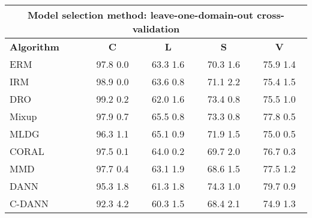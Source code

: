 \documentclass{article}
\begin{document}
\begin{center}
\begin{tabular}{lcccc}
\toprule
\multicolumn{5}{c}{\textbf{Model selection method: leave-one-domain-out cross-validation}} \\
\midrule
\textbf{Algorithm}    & \textbf{C}                & \textbf{L}                & \textbf{S}                & \textbf{V}                \\
\midrule
ERM                       & 97.8  0.0            & 63.3  1.6            & 70.3  1.6            & 75.9  1.4            \\
IRM                       & 98.9  0.0            & 63.6  0.8            & 71.1  2.2            & 75.4  1.5            \\
DRO                 & 99.2  0.2            & 62.0  1.6            & 73.4  0.8            & 75.5  1.0            \\
Mixup                     & 97.9  0.7            & 65.5  0.8            & 73.3  0.8            & 77.8  0.5            \\
MLDG                      & 96.3  1.1            & 65.1  0.9            & 71.9  1.5            & 75.0  0.5            \\
CORAL                     & 97.5  0.1            & 64.0  0.2            & 69.7  2.0            & 76.7  0.3            \\
MMD                       & 97.7  0.4            & 63.1  1.9            & 68.6  1.5            & 77.5  1.2            \\
DANN                       & 95.3  1.8            & 61.3  1.8            & 74.3  1.0            & 79.7  0.9            \\
C-DANN                   & 92.3  4.2            & 60.3  1.5            & 68.4  2.1            & 74.9  1.3            \\
\bottomrule
\end{tabular}
\end{center}
\end{document}
